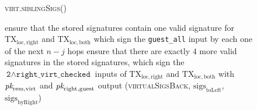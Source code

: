 \begin{figure}[H]
\begin{processbox}{\textsc{virt.siblingSigs}()}
\begin{algorithmic}[1]
      \State ensure that the stored signatures contain one valid signature for
      $\mathrm{TX}_{\mathrm{loc}, \mathrm{right}}$ and
      $\mathrm{TX}_{\mathrm{loc}, \mathrm{both}}$ which sign the
      \texttt{guest\_all} input by each one of the next $n-j$ hops
      \State ensure that there are exactly $4$ more valid signatures in the
      stored signatures, which sign the $\texttt{2} \wedge
      \texttt{right\_virt\_checked}$ inputs of $\mathrm{TX}_{\mathrm{loc},
      \mathrm{right}}$ and $\mathrm{TX}_{\mathrm{loc}, \mathrm{both}}$ with
      $\textit{pk}_{\mathrm{rem}, \mathrm{virt}}$ and $\textit{pk}_{\mathrm{right},
      \mathrm{guest}}$
      \State output (\textsc{virtualSigsBack},
      $\mathrm{sigs}_{\mathrm{toLeft}}$, $\mathrm{sigs}_{\mathrm{byRight}}$)
    \end{algorithmic}
  \end{processbox}
  \caption{}
  \label{code:virtual-layer:sibling-sigs}
\end{figure}

